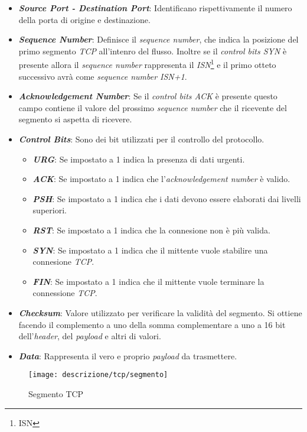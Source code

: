 \begin{itemize}
\item \textit{\textbf{Source Port - Destination Port}}: Identificano rispettivamente il numero della porta di origine e destinazione.
\item \textit{\textbf{Sequence Number}}: Definisce il \emph{sequence number}, che indica la posizione del primo segmento \emph{TCP} all'intenro del flusso. Inoltre se il \emph{control bits SYN} è presente allora il \emph{sequence number} rappresenta il \emph{ISN}\footnote{\gls{ISN}} e il primo otteto successivo avrà come \emph{sequence number ISN+1}.
\item \textit{\textbf{Acknowledgement Number}}: Se il \emph{control bits ACK} è presente questo campo contiene il valore del prossimo \emph{sequence number} che il ricevente del segmento si aspetta di ricevere.
\item \textit{\textbf{Control Bits}}: Sono dei bit utilizzati per il controllo del protocollo. 
\begin{itemize}
    \item \textit{\textbf{URG}}: Se impostato a 1 indica la presenza di dati urgenti.
    \item \textit{\textbf{ACK}}: Se impostato a 1 indica che l'\emph{acknowledgement number} è valido.
    \item \textit{\textbf{PSH}}: Se impostato a 1 indica che i dati devono essere elaborati dai livelli superiori.
    \item \textit{\textbf{RST}}: Se impostato a 1 indica che la connesione non è più valida.
    \item \textit{\textbf{SYN}}: Se impostato a 1 indica che il mittente vuole stabilire una connesione \emph{TCP}.
    \item \textit{\textbf{FIN}}: Se impostato a 1 indica che il mittente vuole terminare la connessione \emph{TCP}.
\end{itemize}

\item \textit{\textbf{Checksum}}: Valore utilizzato per verificare la validità del segmento. Si ottiene facendo il complemento a uno della somma complementare a uno a 16 bit dell'\emph{header}, del \emph{payload} e altri di valori.
\item \textit{\textbf{Data}}: Rappresenta il vero e proprio \emph{payload} da trasmettere.
\end{itemize}

\begin{figure}[!h]
\centering
\texttt{[image: descrizione/tcp/segmento]}
\caption{Segmento TCP}
\label{fig}
\end{figure}

